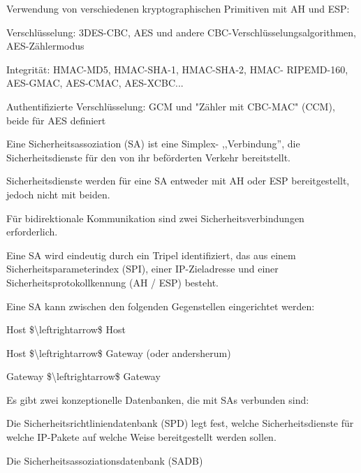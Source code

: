 \documentclass[a4paper]{article}
\begin{document}
\begin{multicols}{3}
\begin{itemize*}
            \begin{itemize*}
                  \item Verwendung von verschiedenen kryptographischen Primitiven mit AH und ESP:
                  \begin{itemize*} \item Verschlüsselung: 3DES-CBC, AES und andere CBC-Verschlüsselungsalgorithmen, AES-Zählermodus \item Integrität: HMAC-MD5, HMAC-SHA-1, HMAC-SHA-2, HMAC- RIPEMD-160, AES-GMAC, AES-CMAC, AES-XCBC... \item Authentifizierte Verschlüsselung: GCM und "Zähler mit CBC-MAC" (CCM), beide für AES definiert \end{itemize*}
            \end{itemize*}
            \item Eine Sicherheitsassoziation (SA) ist eine Simplex- ,,Verbindung'', die Sicherheitsdienste für den von ihr beförderten Verkehr bereitstellt.
            \begin{itemize*}
                  \item Sicherheitsdienste werden für eine SA entweder mit AH oder ESP bereitgestellt, jedoch nicht mit beiden.
                  \item Für bidirektionale Kommunikation sind zwei Sicherheitsverbindungen erforderlich.
                  \item Eine SA wird eindeutig durch ein Tripel identifiziert, das aus einem Sicherheitsparameterindex (SPI), einer IP-Zieladresse und einer Sicherheitsprotokollkennung (AH / ESP) besteht.
                  \item Eine SA kann zwischen den folgenden Gegenstellen eingerichtet werden:
                  \begin{itemize*} \item Host \$\textbackslash leftrightarrow\$ Host \item Host \$\textbackslash leftrightarrow\$ Gateway (oder andersherum) \item Gateway \$\textbackslash leftrightarrow\$ Gateway \end{itemize*}
                  \item Es gibt zwei konzeptionelle Datenbanken, die mit SAs verbunden sind:
                  \begin{itemize*} \item Die Sicherheitsrichtliniendatenbank (SPD) legt fest, welche Sicherheitsdienste für welche IP-Pakete auf welche Weise bereitgestellt werden sollen. \item Die Sicherheitsassoziationsdatenbank (SADB) \end{itemize*}

\end{itemize*}
\end{itemize*}
\end{multicols}
\end{document}
